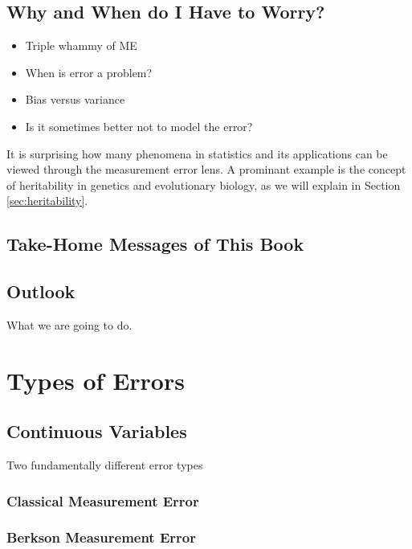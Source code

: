 \documentclass[]{book}
\providecommand{\tightlist}{%
  \setlength{\itemsep}{0pt}\setlength{\parskip}{0pt}}
\theoremstyle{definition}
\theoremstyle{definition}
\theoremstyle{definition}
\theoremstyle{remark}
\begin{document}
\section{Why and When do I Have to
Worry?}\label{why-and-when-do-i-have-to-worry}

\begin{itemize}
\tightlist
\item
  Triple whammy of ME
\item
  When is error a problem?
\item
  Bias versus variance
\item
  Is it sometimes better not to model the error?
\end{itemize}

It is surprising how many phenomena in statistics and its applications
can be viewed through the measurement error lens. A prominant example is
the concept of heritability in genetics and evolutionary biology, as we
will explain in Section \ref{sec:heritability}.

\section{Take-Home Messages of This
Book}\label{take-home-messages-of-this-book}

\section{Outlook}\label{outlook}

What we are going to do.

\chapter{Types of Errors}\label{types-of-errors}

\section{Continuous Variables}\label{sec:errortypes}

Two fundamentally different error types

\subsection{Classical Measurement
Error}\label{classical-measurement-error}

\subsection{Berkson Measurement Error}\label{berkson-measurement-error}
\end{document}
